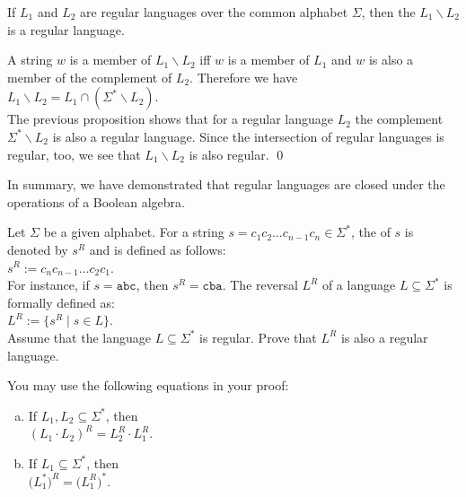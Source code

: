 \begin{Corollary} \label{kor:mengendif}
  If $L_1$ and $L_2$ are regular languages over the common alphabet $\Sigma$, then the 
   $L_1 \backslash L_2$  is a regular language.
\end{Corollary}

\proofEng
A string $w$ is a member of $L_1 \backslash L_2$ iff $w$ is a member of $L_1$
and $w$ is also a member of the complement of $L_2$.  Therefore we have
\\[0.2cm]
\hspace*{1.3cm}
$L_1 \backslash L_2 = L_1 \cap (\Sigma^* \backslash L_2)$.
\\[0.2cm]
The previous proposition shows that for a regular language $L_2$ the complement
$\Sigma^* \backslash L_2$ is also a regular language.  Since the intersection of regular languages is regular,
too, we see that $L_1 \backslash L_2$ is also regular.
\qed
\vspace*{0.3cm}

In summary, we have demonstrated that regular languages are closed under the operations of a Boolean algebra.


\exerciseEng
Let $\Sigma$ be a given alphabet.  For a string $s = c_1 c_2 \ldots c_{n-1} c_n \in \Sigma^*$, the
  of $s$ is denoted by $s^R$ and is defined as follows:
\\[0.2cm]
\hspace*{1.3cm}
$s^R := c_n c_{n-1} \ldots c_2 c_1$.
\\[0.2cm]
For instance, if $s = \mathtt{abc}$, then $s^R = \mathtt{cba}$.  The reversal $L^R$ of a language
$L \subseteq \Sigma^*$ is formally defined as:
\\[0.2cm]
\hspace*{1.3cm}
$L^R := \bigl\{ s^R \mid s \in L \bigr\}$.
\\[0.2cm]
Assume that the language $L \subseteq \Sigma^*$ is regular.  Prove that $L^R$ is also a regular language.

\hint
You may use the following equations in your proof:
\begin{enumerate}[(a)]
\item If $L_1,L_2 \subseteq \Sigma^*$, then 
      \\[0.2cm]
      \hspace*{1.3cm}
      $(L_1 \cdot L_2)^R = L_2^R \cdot L_1^R$.
\item If $L_1 \subseteq \Sigma^*$, then
      \\[0.2cm]
      \hspace*{1.3cm}
      $\bigl(L_1^*\bigr)^R = \bigl(L_1^R\bigr)^*$. \eox
\end{enumerate}



